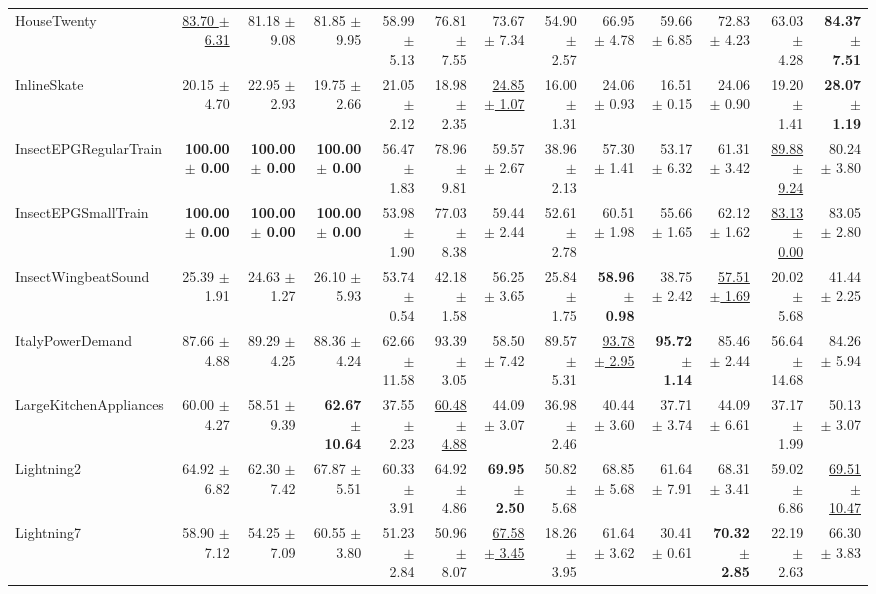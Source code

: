 \begin{landscape}
\begin{longtable}{lrrrrrrrrrrrr}
HouseTwenty & \underline{83.70 $\pm$ 6.31} & 81.18 $\pm$ 9.08 & 81.85 $\pm$ 9.95 & 58.99 $\pm$ 5.13 & 76.81 $\pm$ 7.55 & 73.67 $\pm$ 7.34 & 54.90 $\pm$ 2.57 & 66.95 $\pm$ 4.78 & 59.66 $\pm$ 6.85 & 72.83 $\pm$ 4.23 & 63.03 $\pm$ 4.28 & \textbf{84.37 $\pm$ 7.51} \\
InlineSkate & 20.15 $\pm$ 4.70 & 22.95 $\pm$ 2.93 & 19.75 $\pm$ 2.66 & 21.05 $\pm$ 2.12 & 18.98 $\pm$ 2.35 & \underline{24.85 $\pm$ 1.07} & 16.00 $\pm$ 1.31 & 24.06 $\pm$ 0.93 & 16.51 $\pm$ 0.15 & 24.06 $\pm$ 0.90 & 19.20 $\pm$ 1.41 & \textbf{28.07 $\pm$ 1.19} \\
InsectEPGRegularTrain & \textbf{100.00 $\pm$ 0.00} & \textbf{100.00 $\pm$ 0.00} & \textbf{100.00 $\pm$ 0.00} & 56.47 $\pm$ 1.83 & 78.96 $\pm$ 9.81 & 59.57 $\pm$ 2.67 & 38.96 $\pm$ 2.13 & 57.30 $\pm$ 1.41 & 53.17 $\pm$ 6.32 & 61.31 $\pm$ 3.42 & \underline{89.88 $\pm$ 9.24} & 80.24 $\pm$ 3.80 \\
InsectEPGSmallTrain & \textbf{100.00 $\pm$ 0.00} & \textbf{100.00 $\pm$ 0.00} & \textbf{100.00 $\pm$ 0.00} & 53.98 $\pm$ 1.90 & 77.03 $\pm$ 8.38 & 59.44 $\pm$ 2.44 & 52.61 $\pm$ 2.78 & 60.51 $\pm$ 1.98 & 55.66 $\pm$ 1.65 & 62.12 $\pm$ 1.62 & \underline{83.13 $\pm$ 0.00} & 83.05 $\pm$ 2.80 \\
InsectWingbeatSound & 25.39 $\pm$ 1.91 & 24.63 $\pm$ 1.27 & 26.10 $\pm$ 5.93 & 53.74 $\pm$ 0.54 & 42.18 $\pm$ 1.58 & 56.25 $\pm$ 3.65 & 25.84 $\pm$ 1.75 & \textbf{58.96 $\pm$ 0.98} & 38.75 $\pm$ 2.42 & \underline{57.51 $\pm$ 1.69} & 20.02 $\pm$ 5.68 & 41.44 $\pm$ 2.25 \\
ItalyPowerDemand & 87.66 $\pm$ 4.88 & 89.29 $\pm$ 4.25 & 88.36 $\pm$ 4.24 & 62.66 $\pm$ 11.58 & 93.39 $\pm$ 3.05 & 58.50 $\pm$ 7.42 & 89.57 $\pm$ 5.31 & \underline{93.78 $\pm$ 2.95} & \textbf{95.72 $\pm$ 1.14} & 85.46 $\pm$ 2.44 & 56.64 $\pm$ 14.68 & 84.26 $\pm$ 5.94 \\
LargeKitchenAppliances & 60.00 $\pm$ 4.27 & 58.51 $\pm$ 9.39 & \textbf{62.67 $\pm$ 10.64} & 37.55 $\pm$ 2.23 & \underline{60.48 $\pm$ 4.88} & 44.09 $\pm$ 3.07 & 36.98 $\pm$ 2.46 & 40.44 $\pm$ 3.60 & 37.71 $\pm$ 3.74 & 44.09 $\pm$ 6.61 & 37.17 $\pm$ 1.99 & 50.13 $\pm$ 3.07 \\
Lightning2 & 64.92 $\pm$ 6.82 & 62.30 $\pm$ 7.42 & 67.87 $\pm$ 5.51 & 60.33 $\pm$ 3.91 & 64.92 $\pm$ 4.86 & \textbf{69.95 $\pm$ 2.50} & 50.82 $\pm$ 5.68 & 68.85 $\pm$ 5.68 & 61.64 $\pm$ 7.91 & 68.31 $\pm$ 3.41 & 59.02 $\pm$ 6.86 & \underline{69.51 $\pm$ 10.47} \\
Lightning7 & 58.90 $\pm$ 7.12 & 54.25 $\pm$ 7.09 & 60.55 $\pm$ 3.80 & 51.23 $\pm$ 2.84 & 50.96 $\pm$ 8.07 & \underline{67.58 $\pm$ 3.45} & 18.26 $\pm$ 3.95 & 61.64 $\pm$ 3.62 & 30.41 $\pm$ 0.61 & \textbf{70.32 $\pm$ 2.85} & 22.19 $\pm$ 2.63 & 66.30 $\pm$ 3.83 \\

\end{longtable}
\end{landscape}
